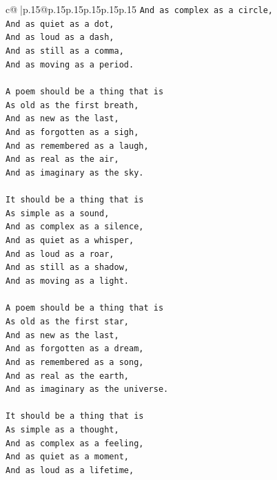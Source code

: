 \documentclass{article}
\begin{document}
{\begin{supertabular}{c@{$\;$}|p{.15\linewidth}@{}p{.15\linewidth}p{.15\linewidth}p{.15\linewidth}p{.15\linewidth}p{.15\linewidth}}
{{{\texttt{And as complex as a circle,} \\
\texttt{And as quiet as a dot,} \\
\texttt{And as loud as a dash,} \\
\texttt{And as still as a comma,} \\
\texttt{And as moving as a period.} \\
\\ 
\texttt{A poem should be a thing that is} \\
\texttt{As old as the first breath,} \\
\texttt{And as new as the last,} \\
\texttt{And as forgotten as a sigh,} \\
\texttt{And as remembered as a laugh,} \\
\texttt{And as real as the air,} \\
\texttt{And as imaginary as the sky.} \\
\\ 
\texttt{It should be a thing that is} \\
\texttt{As simple as a sound,} \\
\texttt{And as complex as a silence,} \\
\texttt{And as quiet as a whisper,} \\
\texttt{And as loud as a roar,} \\
\texttt{And as still as a shadow,} \\
\texttt{And as moving as a light.} \\
\\ 
\texttt{A poem should be a thing that is} \\
\texttt{As old as the first star,} \\
\texttt{And as new as the last,} \\
\texttt{And as forgotten as a dream,} \\
\texttt{And as remembered as a song,} \\
\texttt{And as real as the earth,} \\
\texttt{And as imaginary as the universe.} \\
\\ 
\texttt{It should be a thing that is} \\
\texttt{As simple as a thought,} \\
\texttt{And as complex as a feeling,} \\
\texttt{And as quiet as a moment,} \\
\texttt{And as loud as a lifetime,} \\
}}}
\end{supertabular}}
\end{document}
